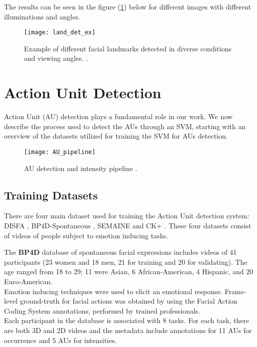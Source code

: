 The results can be seen in the figure (\ref{fig:land_det_ex}) below for different images with different illuminations and angles. 

\begin{figure}[H]
	\centering
	\texttt{[image: land\_det\_ex]}
	\caption{Example of different facial landmarks detected in diverse conditions and viewing angles. \cite{Baltru2018}.}
	\label{fig:land_det_ex}
\end{figure}

\clearpage

\section{Action Unit Detection} \label{au_det}
Action Unit (AU) detection plays a fundamental role in our work. We now describe the process used to detect the AUs through an SVM, starting with an overview of the datasets utilized for training the SVM for AUs detection.

\begin{figure}[H]
	\centering
	\texttt{[image: AU\_pipeline]}
	\caption{AU detection and intensity pipeline \cite{Baltru2015}.}
	\label{fig:AU_pipeline}
\end{figure}

\subsection{Training Datasets}
There are four main dataset used for training the Action Unit detection system: DISFA \cite{DISFA}, BP4D-Spontaneous \cite{BP4D-Spontaneous}, SEMAINE \cite{SEMAINE} and CK+ \cite{CK+}. These four datasets consist of videos of people subject to emotion inducing tasks.

The \textbf{BP4D} database of spontaneous facial expressions includes videos of 41 participants (23 women and 18 men, 21 for training and 20 for validating). The age ranged from 18 to 29; 11 were Asian, 6 African-American, 4 Hispanic, and 20 Euro-American. \\
Emotion inducing techniques were used to elicit an emotional response. Frame-level ground-truth for facial actions was obtained by using the Facial Action Coding System annotations, performed by trained professionals. \\
Each participant in the database is associated with 8 tasks. For each task, there are both 3D and 2D videos and the metadata include annotations for 11 AUs for occurrence and 5 AUs for intensities.

